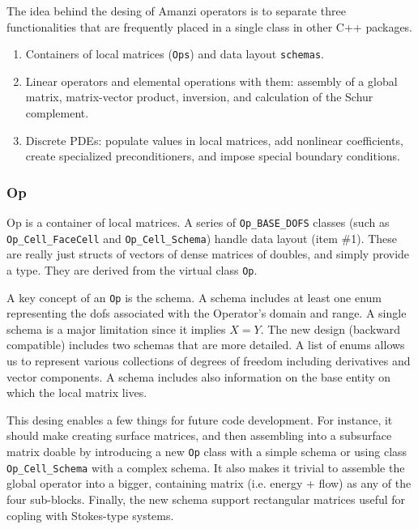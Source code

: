 The idea behind the desing of Amanzi operators is to separate three 
functionalities that are frequently placed in a single class in other
C++ packages.

\begin{enumerate}
\item Containers of local matrices ({\tt Ops}) and data layout {\tt schemas}.

\item Linear operators and elemental operations with them: assembly of a global 
      matrix, matrix-vector product, inversion, and calculation of the Schur complement.

\item Discrete PDEs: populate values in local matrices, add nonlinear 
coefficients, create specialized preconditioners, and impose special
boundary conditions. 
\end{enumerate}

\subsubsection{Op}
Op is a container of local matrices.
A series of {\tt Op\_BASE\_DOFS} classes (such as {\tt Op\_Cell\_FaceCell} and 
{\tt Op\_Cell\_Schema}) handle data layout (item \#1). 
These are really just structs of vectors of
dense matrices of doubles, and simply provide a type.
They are derived from the virtual class {\tt Op}.

A key concept of an {\tt Op} is the schema. 
A schema includes at least one enum representing the dofs associated
with the Operator's domain and range. A single schema is a major limitation 
since it implies $X=Y$.
The new design (backward compatible) includes two schemas that are more 
detailed. A list of enums allows us to represent various collections of 
degrees of freedom including derivatives and vector components.
A schema includes also information on the base entity on which the local 
matrix lives.

This desing enables a few things for future code development.
For instance, it should make creating surface matrices, and then assembling into a 
subsurface matrix doable by introducing a new {\tt Op} class with a simple schema
or using class {\tt Op\_Cell\_Schema} with a complex schema. 
It also makes it trivial to assemble the global operator into a bigger, containing 
matrix (i.e. energy + flow) as any of the four sub-blocks.
Finally, the new schema support rectangular matrices useful for copling with 
Stokes-type systems.

